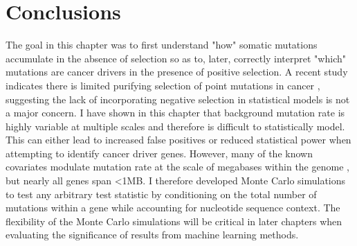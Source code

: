 \section{Conclusions}

The goal in this chapter was to first understand "how" somatic mutations accumulate in the absence of selection so as to, later, correctly interpret "which" mutations are cancer drivers in the presence of positive selection. A recent study indicates there is limited purifying selection of point mutations in cancer \cite{RN56}, suggesting the lack of incorporating negative selection in statistical models is not a major concern. I have shown in this chapter that background mutation rate is highly variable at multiple scales and therefore is difficult to statistically model. This can either lead to increased false positives or reduced statistical power when attempting to identify cancer driver genes. However, many of the known covariates modulate mutation rate at the scale of megabases within the genome \cite{RN74}, but nearly all genes span <1MB. I therefore developed Monte Carlo simulations to test any arbitrary test statistic by conditioning on the total number of mutations within a gene while accounting for nucleotide sequence context. The flexibility of the Monte Carlo simulations will be critical in later chapters when evaluating the significance of results from machine learning methods. 